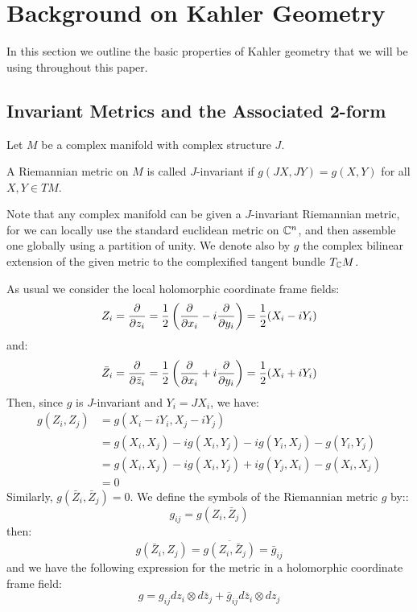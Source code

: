 \section{Background on Kahler Geometry}

In this section we outline the basic properties of Kahler geometry that we will be using throughout this paper.

\subsection{Invariant Metrics and the Associated 2-form}

Let $M$ be a complex manifold with complex structure $J$.
%
\begin{definition} A Riemannian metric on $M$ is called $J$-invariant if $g(JX, JY) = g(X, Y)$ for all $X,Y \in TM$.
\end{definition}
%
Note that any complex manifold can be given a $J$-invariant Riemannian metric, for we can locally use the standard euclidean metric on $\mathbb{C}^n$, and then assemble one globally using a partition of unity.  
%
We denote also by $g$ the complex bilinear extension of the given metric to the complexified tangent bundle $T_{\mathbb{C}}M$.  

As usual we consider the local holomorphic coordinate frame fields:
%
$$ Z_i = \frac{ \partial }{ \partial z_i } = \frac{1}{2} \left( \frac{ \partial }{ \partial x_i } - i \frac{ \partial }{ \partial y_i } \right) = \frac{1}{2}(X_i - i Y_i) $$
%
and:
%
$$\bar{Z}_i = \frac{ \partial }{ \partial \bar{z}_i } = \frac{1}{2} \left( \frac{ \partial }{ \partial x_i } + i \frac{ \partial }{ \partial y_i } \right) = \frac{1}{2} ( X_i + i Y_i ) $$
%
Then, since  $g$ is $J$-invariant and $Y_i = J X_i$, we have:
%
\begin{align*}
g(Z_i, Z_j) &= g( X_i - i Y_i, X_j - i Y_j ) \\
&= g( X_i, X_j ) - i g(X_i, Y_j) - i g(Y_i, X_j) - g(Y_i, Y_j) \\
&= g( X_i, X_j ) - i g(X_i, Y_j) + i g(Y_j, X_i) - g(X_i, X_j) \\
&= 0
\end{align*}
%
Similarly, $g( \bar{Z}_i, \bar{Z}_j ) = 0$.  
%
We define the symbols of the Riemannian metric $g$ by::
%
$$ g_{ij} = g( Z_i, \bar{Z}_j ) $$
%
then:
%
$$ g( \bar{Z}_i, Z_j ) = \overline{ g( Z_i, \bar{Z}_j ) } = \bar{g}_{ij} $$
%
and we have the following expression for the metric in a holomorphic coordinate frame field:
%
$$ g = g_{ij} d z_i \otimes d \bar{z}_j + \bar{g}_{ij} d \bar{z}_i \otimes d z_j $$

